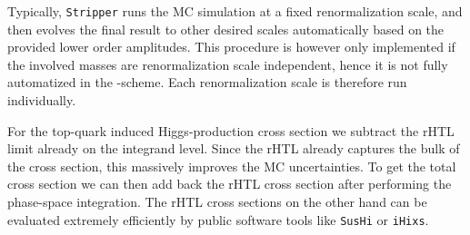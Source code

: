 Typically, \texttt{Stripper} runs the \acs{MC} simulation at a fixed renormalization scale, and then evolves the final result to other desired scales automatically based on the provided lower order amplitudes. This procedure is however only implemented if the involved masses are renormalization scale independent, hence it is not fully automatized in the \MS-scheme. Each renormalization scale is therefore run individually.

For the top-quark induced Higgs-production cross section we subtract the \acs{rHTL} limit already on the integrand level. Since the \acs{rHTL} already captures the bulk of the cross section, this massively improves the \acs{MC} uncertainties. To get the total cross section we can then add back the \acs{rHTL} cross section after performing the phase-space integration. The \acs{rHTL} cross sections on the other hand can be evaluated extremely efficiently by public software tools like \texttt{SusHi} or \texttt{iHixs}.

